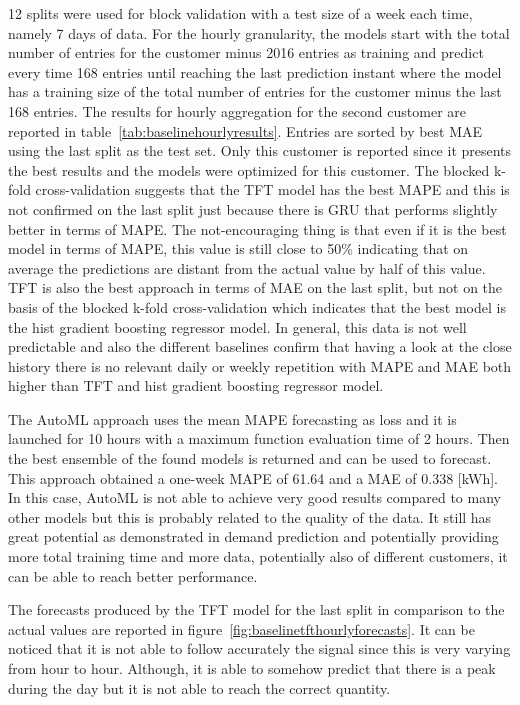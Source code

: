 12 splits were used for block validation with a test size of a week each time, namely 7 days of data.
For the hourly granularity, the models start with the total number of entries for the customer minus 2016 entries as training and predict every time 168 entries until reaching the last prediction instant where the model has a training size of the total number of entries for the customer minus the last 168 entries.
The results for hourly aggregation for the second customer are reported in table~\ref{tab:baselinehourlyresults}.
Entries are sorted by best MAE using the last split as the test set.
Only this customer is reported since it presents the best results and the models were optimized for this customer.
The blocked k-fold cross-validation suggests that the TFT model has the best MAPE and this is not confirmed on the last split just because there is GRU that performs slightly better in terms of MAPE.
The not-encouraging thing is that even if it is the best model in terms of MAPE, this value is still close to 50\% indicating that on average the predictions are distant from the actual value by half of this value.
TFT is also the best approach in terms of MAE on the last split, but not on the basis of the blocked k-fold cross-validation which indicates that the best model is the hist gradient boosting regressor model.
In general, this data is not well predictable and also the different baselines confirm that having a look at the close history there is no relevant daily or weekly repetition with MAPE and MAE both higher than TFT and hist gradient boosting regressor model.

The AutoML approach uses the mean MAPE forecasting as loss and it is launched for 10 hours with a maximum function evaluation time of 2 hours.
Then the best ensemble of the found models is returned and can be used to forecast.
This approach obtained a one-week MAPE of 61.64 and a MAE of 0.338 [kWh].
In this case, AutoML is not able to achieve very good results compared to many other models but this is probably related to the quality of the data.
It still has great potential as demonstrated in demand prediction and potentially providing more total training time and more data, potentially also of different customers, it can be able to reach better performance.

The forecasts produced by the TFT model for the last split in comparison to the actual values are reported in figure~\ref{fig:baselinetfthourlyforecasts}.
It can be noticed that it is not able to follow accurately the signal since this is very varying from hour to hour.
Although, it is able to somehow predict that there is a peak during the day but it is not able to reach the correct quantity.

